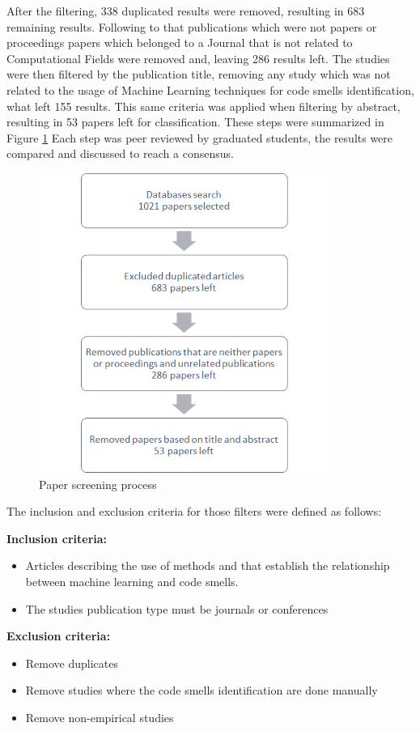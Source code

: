 After the filtering, 338 duplicated results were removed, resulting in 683 remaining results. Following to that publications which were not papers or proceedings papers which belonged to a Journal that is not related to Computational Fields were removed and, leaving 286 results left. The studies were then filtered by the publication title, removing any study which was not related to the usage of Machine Learning techniques for code smells identification, what left 155 results. This same criteria was applied when filtering by abstract, resulting in 53 papers left for classification. These steps were summarized in Figure \ref{fig:paperScreening}  Each step was peer reviewed by graduated students, the  results were compared and discussed to reach a consensus.

\begin{figure}[hbt] 
    \centering
    \caption{Paper screening process}
	\label{fig:paperScreening}
	\includegraphics[]{imagens/paperScreening.png}
\end{figure}

The inclusion and exclusion criteria for those filters were defined as follows:

\noindent \textbf{Inclusion criteria:}
\begin{itemize}
    \item Articles describing the use of methods and that establish the relationship between machine learning and code smells.
    \item The studies publication type must be journals or conferences
\end{itemize}

\noindent \textbf{Exclusion criteria:}
\begin{itemize}
    \item Remove duplicates
    \item Remove studies where the code smells identification are done manually
    \item Remove non-empirical studies
\end{itemize}

